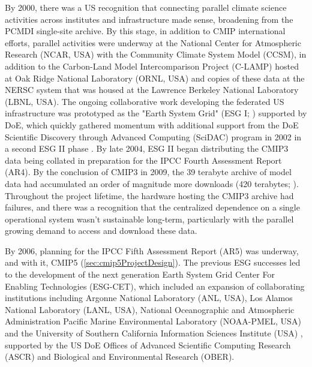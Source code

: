 \documentclass[gmd, preprint]{copernicus}
\begin{document}
By 2000, there was a US recognition that connecting parallel climate science activities across institutes and infrastructure made sense, broadening from the PCMDI single-site archive. By this stage, in addition to CMIP international efforts, parallel activities were underway at the National Center for Atmospheric Research (NCAR, USA) with the Community Climate System Model (CCSM), in addition to the Carbon-Land Model Intercomparison Project (C-LAMP) hosted at Oak Ridge National Laboratory (ORNL, USA) and copies of these data at the NERSC system that was housed at the Lawrence Berkeley National Laboratory (LBNL, USA). The ongoing collaborative work developing the federated US infrastructure was prototyped as the "Earth System Grid" (ESG I; \citet{bernholdt_earth_2007}) supported by DoE, which quickly gathered momentum with additional support from the DoE Scientific Discovery through Advanced Computing (SciDAC) program in 2002 in a second ESG II phase \citep{williams_earth_2009}. By late 2004, ESG II began distributing the CMIP3 data being collated in preparation for the IPCC Fourth Assessment Report (AR4). By the conclusion of CMIP3 in 2009, the 39 terabyte archive of model data had accumulated an order of magnitude more downloads (420 terabytes; \citet{ananthakrishnan_building_2007, williams_earth_2009}). Throughout the project lifetime, the hardware hosting the CMIP3 archive had failures, and there was a recognition that the centralized dependence on a single operational system wasn't sustainable long-term, particularly with the parallel growing demand to access and download these data.

By 2006, planning for the IPCC Fifth Assessment Report (AR5) was underway, and with it, CMIP5 (\autoref{sec:cmip5ProjectDesign}). The previous ESG successes led to the development of the next generation Earth System Grid Center For Enabling Technologies (ESG-CET), which included an expansion of collaborating institutions including Argonne National Laboratory (ANL, USA), Los Alamos National Laboratory (LANL, USA), National Oceanographic and Atmospheric Administration Pacific Marine Environmental Laboratory (NOAA-PMEL, USA) and the University of Southern California Information Sciences Institute (USA) \citep{ananthakrishnan_building_2007}, supported by the US DoE Offices of Advanced Scientific Computing Research (ASCR) and Biological and Environmental Research (OBER).
\end{document}
